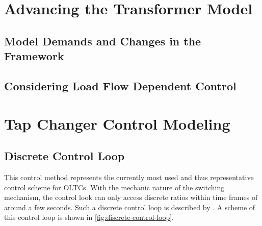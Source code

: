 \section{Advancing the Transformer Model}


\subsection{Model Demands and Changes in the Framework}


\subsection{Considering Load Flow Dependent Control}


\section{Tap Changer Control Modeling}


\subsection{Discrete Control Loop}
This control method represents the currently most used and thus representative control scheme for \acsp{OLTC}. With the mechanic nature of the switching mechanism, the control look can only access discrete ratios within time frames of around a few seconds. Such a discrete control loop is described by \textcite{milanoHybridControlModel2011,milanoPowerSystemModelling2010}. A scheme of this control loop is shown in \autoref{fig:discrete-control-loop}.

